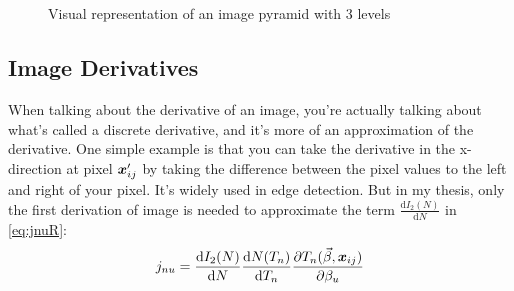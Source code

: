 \begin{figure}[htbp]\centering
	 \\
	 \\
	\caption{Visual representation of an image pyramid with 3 levels}
	\label{fig:iamge pyramid}
\end{figure}



\subsection{Image Derivatives}\label{sec:Image derivatives}
When talking about the derivative of an image, you're actually talking about what's called a discrete derivative, and it's more of an approximation of the derivative. One simple example is that you can take the derivative in the x-direction at pixel $\boldsymbol{x}'_{ij}$ by taking the difference between the pixel values to the left and right of your pixel. It's widely used in edge detection. But in my thesis, only the first derivation of image is needed to approximate the term $\frac{\mathrm{d} I_2(N)}{\mathrm{d}N}$ in \cref{eq:jnuR}:
\begin{align}
	j_{nu} 
	= \frac{\mathrm{d} I_2(N)}{\mathrm{d}N} \frac{\mathrm{d} N(T_n)}{\mathrm{d} T_n} \frac{\partial T_n(\vec{\beta}, \boldsymbol{x}_{ij})}{\partial \beta_u} \nonumber
\end{align}

